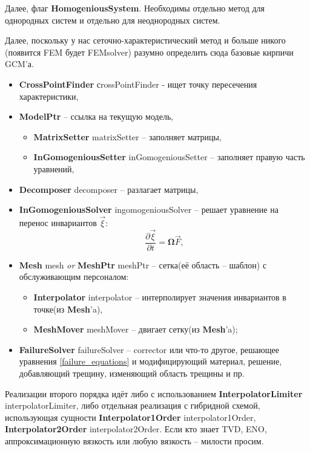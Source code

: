 \documentclass[a4paper,12pt]{article}
\numberwithin{equation}{section}
\begin{document}
	Далее, флаг \textbf{HomogeniousSystem}. Необходимы отдельно метод для однородных систем и отдельно для неоднородных систем.
	
	Далее, поскольку у нас сеточно-характеристический метод и больше никого (появится FEM будет FEMsolver) разумно определить сюда базовые кирпичи GCM'а.
	
	\begin{itemize}
		\item{\textbf{CrossPointFinder} сrossPointFinder - ищет точку пересечения характеристики,}
		\item{\textbf{ModelPtr} -- ссылка на текущую модель,}
		\begin{itemize}
			\item{\textbf{MatrixSetter} matrixSetter -- заполняет матрицы,}
			\item{\textbf{InGomogeniousSetter} inGomogeniousSetter -- заполняет правую часть уравнений,}
		\end{itemize}
		\item{\textbf{Decomposer} decomposer -- разлагает матрицы,}
		\item{\textbf{InGomogeniousSolver} ingomogeniousSolver -- решает уравнение на перенос инвариантов $\vec{\xi}$:}
		\begin{equation}
			\label{invariant_equation}
			\frac{\partial\vec{\xi}}{\partial{t}}=\mathbf{\Omega}\vec{F},
		\end{equation}
		\item{\textbf{Mesh} mesh \textit{or} \textbf{MeshPtr} meshPtr  -- сетка(её область -- шаблон) с обслуживающим персоналом:}
		\begin{itemize}
			\item{\textbf{Interpolator} interpolator -- интерполирует значения инвариантов в точке(из \textbf{Mesh}'a),}
			\item{\textbf{MeshMover} meshMover -- двигает сетку(из \textbf{Mesh}'a);}
		\end{itemize}
		\item{\textbf{FailureSolver} failureSolver -- corrector или что-то другое, решающее уравнения \eqref{failure_equations} и модифицирующий материал, решение, добавляющий трещину, изменяющий область трещины и пр.}
	\end{itemize}
	
	Реализации второго порядка идёт либо с использованием \textbf{InterpolatorLimiter} interpolatorLimiter, либо отдельная реализация с гибридной схемой, использующая сущности \textbf{Interpolator1Order} interpolator1Order, \textbf{Interpolator2Order} interpolator2Order.
	Если кто знает TVD, ENO, аппроксимационную вязкость или любую вязкость -- милости просим.
	
\end{document}
